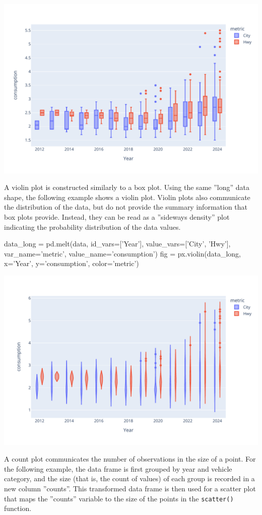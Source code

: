 \begin{center}
  \includegraphics[width=.8\textwidth]{px.fuel.box.pdf}
\end{center}

A violin plot is constructed similarly to a box plot. Using the same ''long'' data shape, the following example shows a violin plot. Violin plots also communicate the distribution of the data, but do not provide the summary information that box plots provide. Instead, they can be read as a ''sideways density'' plot indicating the probability distribution of the data values.

\begin{pythoncode}
data_long = pd.melt(data, 
    id_vars=['Year'], 
    value_vars=['City', 'Hwy'], 
    var_name='metric', 
    value_name='consumption')
fig = px.violin(data_long, x='Year', y='consumption', color='metric')
\end{pythoncode}

\begin{center}
  \includegraphics[width=.8\textwidth]{px.fuel.violin.pdf}
\end{center}

A count plot communicates the number of observations in the size of a point. For the following example, the data frame is first grouped by year and vehicle category, and the size (that is, the count of values) of each group is recorded in a new column ''counts''. This transformed data frame is then used for a scatter plot that maps the ''counts'' variable to the size of the points in the \texttt{scatter()} function.

